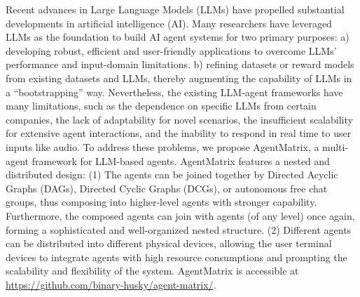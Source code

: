 Recent advances in Large Language Models (LLMs) have propelled substantial developments in artificial intelligence (AI).
Many researchers have leveraged LLMs as the foundation to build AI agent systems for two primary purposes: a) developing robust, efficient and user-friendly applications to overcome LLMs' performance and input-domain limitations. b) refining datasets or reward models from existing datasets and LLMs, thereby augmenting the capability of LLMs in a ``bootstrapping'' way.
Nevertheless, the existing LLM-agent frameworks have many limitations,
such as the dependence on specific LLMs from certain companies, the lack of adaptability for novel scenarios, the insufficient scalability for extensive agent interactions, and the inability to respond in real time to user inputs like audio.
To address these problems, we propose AgentMatrix, a multi-agent framework for LLM-based agents. AgentMatrix features a nested and distributed design: (1) The agents can be joined together by Directed Acyclic Graphs (DAGs), Directed Cyclic Graphs (DCGs), or autonomous free chat groups, thus composing into higher-level agents with stronger capability. Furthermore, the composed agents can join with agents (of any level) once again, forming a sophisticated and well-organized nested structure. (2) Different agents can be distributed into different physical devices, allowing the user terminal devices to integrate agents with high resource consumptions and prompting the scalability and flexibility of the system. AgentMatrix is accessible at \url{https://github.com/binary-husky/agent-matrix/}.
\cite{wolpert1997no}\cite{wolpert1997no}



